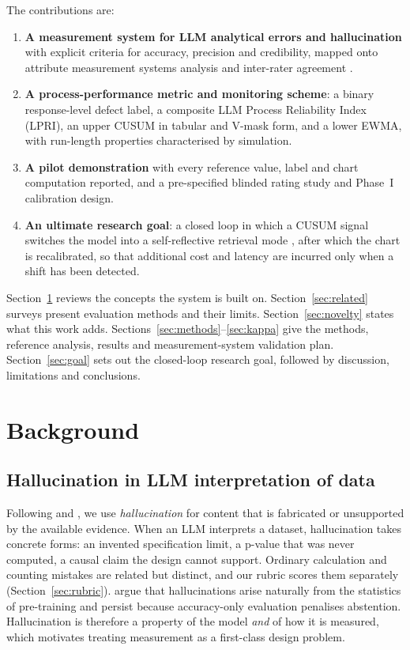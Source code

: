 \documentclass[11pt]{article}
\begin{document}
The contributions are:
\begin{enumerate}[leftmargin=*]
\item \textbf{A measurement system for LLM analytical errors and hallucination} with explicit criteria for accuracy, precision and credibility, mapped onto attribute measurement systems analysis \citep{aiag2010msa} and inter-rater agreement \citep{cohen1960,byrt1993}.
\item \textbf{A process-performance metric and monitoring scheme}: a binary response-level defect label, a composite LLM Process Reliability Index (LPRI), an upper CUSUM in tabular and V-mask form, and a lower EWMA, with run-length properties characterised by simulation.
\item \textbf{A pilot demonstration} with every reference value, label and chart computation reported, and a pre-specified blinded rating study and Phase~I calibration design.
\item \textbf{An ultimate research goal}: a closed loop in which a CUSUM signal switches the model into a self-reflective retrieval mode \citep{asai2024selfrag}, after which the chart is recalibrated, so that additional cost and latency are incurred only when a shift has been detected.
\end{enumerate}

Section~\ref{sec:background} reviews the concepts the system is built on. Section~\ref{sec:related} surveys present evaluation methods and their limits. Section~\ref{sec:novelty} states what this work adds. Sections~\ref{sec:methods}--\ref{sec:kappa} give the methods, reference analysis, results and measurement-system validation plan. Section~\ref{sec:goal} sets out the closed-loop research goal, followed by discussion, limitations and conclusions.

\section{Background}\label{sec:background}

\subsection{Hallucination in LLM interpretation of data}
Following \citet{ji2023hallucination} and \citet{huang2025survey}, we use \emph{hallucination} for content that is fabricated or unsupported by the available evidence. When an LLM interprets a dataset, hallucination takes concrete forms: an invented specification limit, a p-value that was never computed, a causal claim the design cannot support. Ordinary calculation and counting mistakes are related but distinct, and our rubric scores them separately (Section~\ref{sec:rubric}). \citet{kalai2025why} argue that hallucinations arise naturally from the statistics of pre-training and persist because accuracy-only evaluation penalises abstention. Hallucination is therefore a property of the model \emph{and} of how it is measured, which motivates treating measurement as a first-class design problem.
\end{document}
